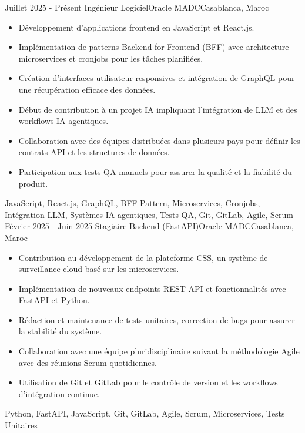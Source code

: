 
\begin{experiences}
  \experience
    {Juillet 2025 - Présent}
    {Ingénieur Logiciel}{Oracle MADC}{Casablanca, Maroc}
    {} {
      \begin{itemize}
        \item Développement d'applications frontend en JavaScript et React.js.
        \item Implémentation de patterns Backend for Frontend (BFF) avec architecture microservices et cronjobs pour les tâches planifiées.
        \item Création d'interfaces utilisateur responsives et intégration de GraphQL pour une récupération efficace des données.
        \item Début de contribution à un projet IA impliquant l'intégration de LLM et des workflows IA agentiques.
        \item Collaboration avec des équipes distribuées dans plusieurs pays pour définir les contrats API et les structures de données.
        \item Participation aux tests QA manuels pour assurer la qualité et la fiabilité du produit.
      \end{itemize}
    }
    {JavaScript, React.js, GraphQL, BFF Pattern, Microservices, Cronjobs, Intégration LLM, Systèmes IA agentiques, Tests QA, Git, GitLab, Agile, Scrum}
  \experience
    {Février 2025 - Juin 2025}
    {Stagiaire Backend (FastAPI)}{Oracle MADC}{Casablanca, Maroc}
    {} {
      \begin{itemize}
        \item Contribution au développement de la plateforme CSS, un système de surveillance cloud basé sur les microservices.
        \item Implémentation de nouveaux endpoints REST API et fonctionnalités avec FastAPI et Python.
        \item Rédaction et maintenance de tests unitaires, correction de bugs pour assurer la stabilité du système.
        \item Collaboration avec une équipe pluridisciplinaire suivant la méthodologie Agile avec des réunions Scrum quotidiennes.
        \item Utilisation de Git et GitLab pour le contrôle de version et les workflows d'intégration continue.
      \end{itemize}
    }
    {Python, FastAPI, JavaScript, Git, GitLab, Agile, Scrum, Microservices, Tests Unitaires}
  \emptySeparator
\end{experiences}
